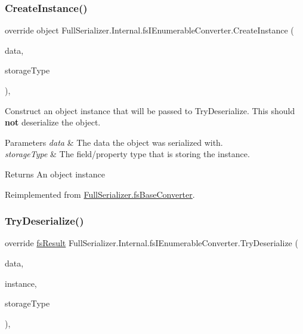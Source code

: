 \subsubsection{\texorpdfstring{Create\+Instance()}{CreateInstance()}}
{\footnotesize\ttfamily override object Full\+Serializer.\+Internal.\+fs\+I\+Enumerable\+Converter.\+Create\+Instance (\begin{DoxyParamCaption}\item[{\hyperlink{class_full_serializer_1_1fs_data}{fs\+Data}}]{data,  }\item[{Type}]{storage\+Type }\end{DoxyParamCaption})\hspace{0.3cm}{\ttfamily [inline]}, {\ttfamily [virtual]}}



Construct an object instance that will be passed to Try\+Deserialize. This should {\bfseries not} deserialize the object. 


\begin{DoxyParams}{Parameters}
{\em data} & The data the object was serialized with.\\
\hline
{\em storage\+Type} & The field/property type that is storing the instance.\\
\hline
\end{DoxyParams}
\begin{DoxyReturn}{Returns}
An object instance
\end{DoxyReturn}


Reimplemented from \hyperlink{class_full_serializer_1_1fs_base_converter_a415ea2ac9429bbb9927346af7cb7c2e1}{Full\+Serializer.\+fs\+Base\+Converter}.

\mbox{\label{class_full_serializer_1_1_internal_1_1fs_i_enumerable_converter_a1585e62338f2abf99911f4fde9599daa}} 
\subsubsection{\texorpdfstring{Try\+Deserialize()}{TryDeserialize()}}
{\footnotesize\ttfamily override \hyperlink{struct_full_serializer_1_1fs_result}{fs\+Result} Full\+Serializer.\+Internal.\+fs\+I\+Enumerable\+Converter.\+Try\+Deserialize (\begin{DoxyParamCaption}\item[{\hyperlink{class_full_serializer_1_1fs_data}{fs\+Data}}]{data,  }\item[{ref object}]{instance,  }\item[{Type}]{storage\+Type }\end{DoxyParamCaption})\hspace{0.3cm}{\ttfamily [inline]}, {\ttfamily [virtual]}}



